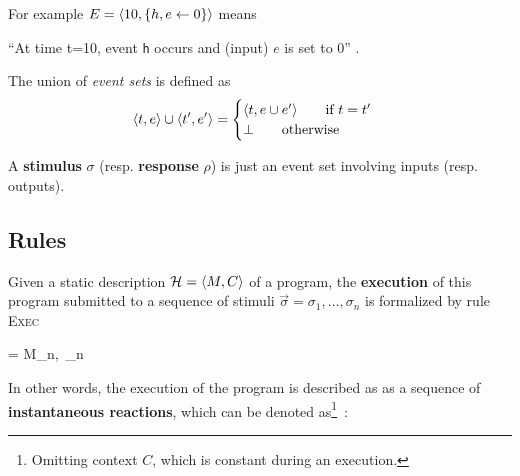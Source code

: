 \medskip
For example $E=\langle10, \{h,e \gets 0\}\rangle$ means

\begin{center}
``At time t=10, event \texttt{h} occurs and (input) $e$ is set to 0'' .
\end{center}

\medskip
The union of \emph{event sets} is defined as
  \begin{eqnarray*}
    \langle t, e\rangle \cup \langle t', e'\rangle =
    \begin{cases}
      \langle t, e \cup e'\rangle \qquad \text{if}\ t=t' \\
      \bot\qquad \text{otherwise}
    \end{cases}
  \end{eqnarray*}

\medskip\step A \textbf{stimulus} $\sigma$ (resp. \textbf{response} $\rho$) is just an event set involving inputs
  (resp. outputs).



\subsection*{Rules}
\label{sec:dynsem-rules}

\step
Given a static description $\mathcal{H}=\langle M, C\rangle$ of a program, the \textbf{execution} of this
program submitted to a sequence of stimuli $\vec{\sigma}=\sigma_1,\ldots,\sigma_n$ is formalized by
rule \textsc{Exec} 


{= \xrightarrow[\vec{\rho}=\sequn{\rho}]{\vec{\sigma}=\sequn{\sigma}} M_n,\ \env_n}

In other words, the execution of the program is described as as a sequence of \textbf{instantaneous
reactions}, which can be denoted as\footnote{Omitting context $C$, which is constant during an
execution.}~:

